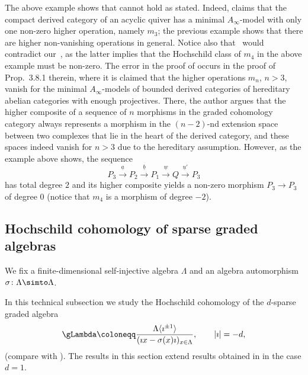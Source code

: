 \documentclass[a4paper]{amsart}
\begin{document}
\begin{remark}
  The above example shows that \cite[Thm.~D]{Her16} cannot hold as stated.
  Indeed, \cite[Thm.~D]{Her16} claims that the compact derived category of an
  acyclic quiver has a minimal $A_\infty$-model with only one non-zero higher
  operation, namely $m_3$; the previous example shows that there are higher
  non-vanishing operations in general. Notice also that~\cite{Her16} would
  contradict our~, as the latter implies that the
  Hochschild class of $m_4$ in the above example must be non-zero. The error in
  the proof of \cite[Thm.~D]{Her16} occurs in the proof of Prop.~3.8.1 therein,
  where it is claimed that the higher operations $m_n$, $n>3$, vanish for the
  minimal $A_\infty$-models of bounded derived categories of hereditary abelian categories
  with enough projectives. There, the author argues that the higher composite of
  a sequence of $n$ morphisms in the graded cohomology category always
  represents a morphism in the $(n-2)$-nd extension space between two complexes
  that lie in the heart of the derived category, and these spaces indeed vanish
  for $n>3$ due to the hereditary assumption. However, as the example above
  shows, the sequence
  \[
    P_3\stackrel{\underline{a}}{\to}P_2\stackrel{\underline{b}}{\to}P_1\stackrel{\underline{w}}{\to}Q\stackrel{\underline{u}'}{\to}P_3
  \]
  has total degree $2$ and its higher composite yields a non-zero morphism
  $P_3\to P_3$ of degree $0$ (notice that $m_4$ is a morphism of degree $-2$). %
\end{remark}

\subsection{Hochschild cohomology of sparse graded algebras}

\begin{setting}
  \label{setting:gLambda}
  We fix a finite-dimensional self-injective algebra $\Lambda$ and an algebra
  automorphism $\sigma\colon\Lambda\simto\Lambda$.
  
  In this technical subsection we study the Hochschild cohomology of the
$d$-sparse graded algebra
\[
  \gLambda\coloneqq\frac{\Lambda\langle\imath^{\pm 1}\rangle}{(\imath
    x-\sigma(x)\imath)_{x\in\Lambda}},\qquad |\imath|=-d,
\]
(compare with ). The results in this section extend
results obtained in \cite{Mur22} in the case $d=1$.
\end{setting}
\end{document}
